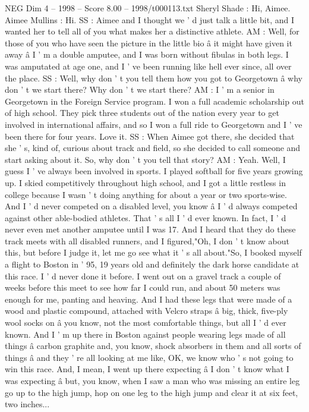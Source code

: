 \begin{textsample}{NEG Dim 4 – 1998 – Score 8.00 – 1998/t000113.txt}  \label{ex:f4_neg_072}
Sheryl Shade : Hi, Aimee.
Aimee Mullins : Hi.
SS : Aimee and I thought we ' d just talk a little bit, and I wanted her to tell all of you what makes her a distinctive athlete.
AM : Well, for those of you who have seen the picture in the little bio â it might have given it away â I ' m a double amputee, and I was born without fibulas in both legs.
I was amputated at age one, and I ' ve been running like hell ever since, all over the place.
SS : Well, why don ' t you tell them how you got to Georgetown â why don ' t we start there?
Why don ' t we start there?
AM : I ' m a senior in Georgetown in the Foreign Service program.
I won a full academic scholarship out of high school.
They pick three students out of the nation every year to get involved in international affairs, and so I won a full ride to Georgetown and I ' ve been there for four years.
Love it.
SS : When Aimee got there, she decided that she ' s, kind of, curious about track and field, so she decided to call someone and start asking about it.
So, why don ' t you tell that story?
AM : Yeah.
Well, I guess I ' ve always been involved in sports.
I played softball for five years growing up.
I skied competitively throughout high school, and I got a little restless in college because I wasn ' t doing anything for about a year or two sports-wise.
And I ' d never competed on a disabled level, you know â I ' d always competed against other able-bodied athletes.
That ' s all I ' d ever known.
In fact, I ' d never even met another amputee until I was 17.
And I heard that they do these track meets with all disabled runners, and I figured,"Oh, I don ' t know about this, but before I judge it, let me go see what it ' s all about."So, I booked myself a flight to Boston in ' 95, 19 years old and definitely the dark horse candidate at this race.
I ' d never done it before.
I went out on a gravel track a couple of weeks before this meet to see how far I could run, and about 50 meters was enough for me, panting and heaving.
And I had these legs that were made of a wood and plastic compound, attached with Velcro straps â big, thick, five-ply wool socks on â you know, not the most comfortable things, but all I ' d ever known.
And I ' m up there in Boston against people wearing legs made of all things â carbon graphite and, you know, shock absorbers in them and all sorts of things â and they ' re all looking at me like, OK, we know who ' s not going to win this race.
And, I mean, I went up there expecting â I don ' t know what I was expecting â but, you know, when I saw a man who was missing an entire leg go up to the high jump, hop on one leg to the high jump and clear it at six feet, two inches...

\end{textsample}
